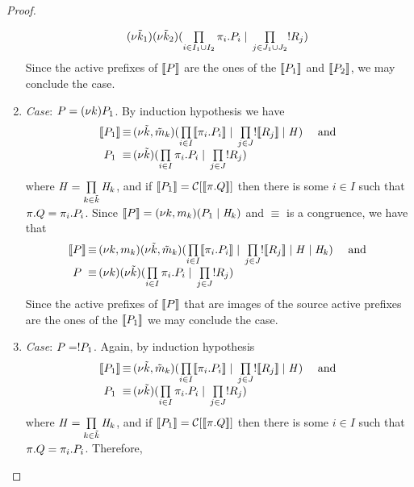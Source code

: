 \begin{proof}
\begin{enumerate}
\[\begin{array}{@{}c@{\;}c@{\;}l@{}}
\rest{\tilde{\NK}_1}\rest{\tilde{\NK}_2}
(\prod\limits_{i\in I_1\cup I_2} \pi_i.\PP_i \parop \prod\limits_{j\in J_1\cup J_2} \rep\PR_j )
\end{array}
\]
Since the active prefixes of $\llbracket P \rrbracket$ are the ones of the $\llbracket P_1 \rrbracket$ and $\llbracket P_2 \rrbracket$, we may conclude the case.
\item \emph{Case}: $P=(\nu k)P_1$. By induction hypothesis we have 
\[
\begin{array}{c@{\,}c@{\,}l}
\enc{\PP_1}
& \equiv & \rest{\tilde{\NK},\tilde{\NM}_\NK}(\prod\limits_{i\in I} \enc{\pi_i.\PP_i} \parop \prod\limits_{j\in J} \rep\enc{\PR_j} \parop \handler) \quad  \text{ and }\\
\PP_1
& \equiv & \rest{\tilde{\NK}}(\prod\limits_{i\in I} \pi_i.\PP_i \parop \prod\limits_{j\in J}\rep\PR_j )
\end{array}
\]
where $\mathit{H}=\prod\limits_{k\in\tilde{k}}\mathit{H}_k$, 
and if $\llbracket P_1 \rrbracket=\mathcal{C}[\llbracket \pi.Q \rrbracket]$ then there is some $i\in I$ such that $\pi.Q=\pi_i.P_i$. 
Since $\llbracket P \rrbracket=(\nu k, m_k)(P_1 \;|\; \mathit{H}_k)$ and $\equiv$ is a congruence, we have that 
\[
\begin{array}{c@{\,}c@{\,}l}
\enc{\PP}
& \equiv & \rest{\NK,\NM_\NK} \rest{\tilde{\NK},\tilde{\NM}_\NK}(\prod\limits_{i\in I} \enc{\pi_i.\PP_i} \parop \prod\limits_{j\in J} \rep\enc{\PR_j} \parop \handler \parop \handler_\NK) \quad  \text{ and }\\
\PP
& \equiv & \rest\NK\rest{\tilde{\NK}}(\prod\limits_{i\in I} \pi_i.\PP_i \parop \prod\limits_{j\in J}\rep\PR_j )
\end{array}
\]
Since the active prefixes of $\llbracket P \rrbracket$ that are images of the source active prefixes are the ones of the $\llbracket P_1 \rrbracket$ we may conclude the case.
\item \emph{Case}: $P=! P_1$. Again, by induction hypothesis 
\[
\begin{array}{c@{\,}c@{\,}l}
\enc{\PP_1}
& \equiv & \rest{\tilde{\NK},\tilde{\NM}_\NK}(\prod\limits_{i\in I} \enc{\pi_i.\PP_i} \parop \prod\limits_{j\in J} \rep\enc{\PR_j} \parop \handler) \quad  \text{ and }\\
\PP_1
& \equiv & \rest{\tilde{\NK}}(\prod\limits_{i\in I} \pi_i.\PP_i \parop \prod\limits_{j\in J}\rep\PR_j )
\end{array}
\]
where $\mathit{H}=\prod\limits_{k\in\tilde{k}}\mathit{H}_k$, 
and if $\llbracket P_1 \rrbracket=\mathcal{C}[\llbracket \pi.Q \rrbracket]$ then there is some $i\in I$ such that $\pi.Q=\pi_i.P_i$. Therefore, 

\end{enumerate}
\end{proof}
